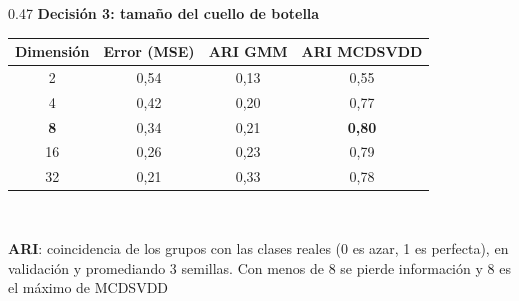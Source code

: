 \begin{frame}
\begin{columns}[T]
\begin{column}{0.47\textwidth}
\centering
{\footnotesize \textbf{Decisión 3: tamaño del cuello de botella}}\\[0.25em]
{\scriptsize \setlength{\tabcolsep}{3pt}
\begin{tabular}{cccc}
\toprule
Dimensión & Error (MSE) & ARI GMM & ARI MCDSVDD \\
\midrule
2  & 0,54 & 0,13 & 0,55 \\
4  & 0,42 & 0,20 & 0,77 \\
\textbf{8} & 0,34 & 0,21 & \textbf{0,80} \\
16 & 0,26 & 0,23 & 0,79 \\
32 & 0,21 & 0,33 & 0,78 \\
\bottomrule
\end{tabular}\\[0.4em]
\parbox{0.97\linewidth}{\centering\scriptsize \textbf{ARI}: coincidencia de los grupos con las
clases reales (0 es azar, 1 es perfecta), en validación y promediando 3 semillas. Con menos de
8 se pierde información y 8 es el máximo de MCDSVDD}
}
\end{column}
\end{columns}
\end{frame}
